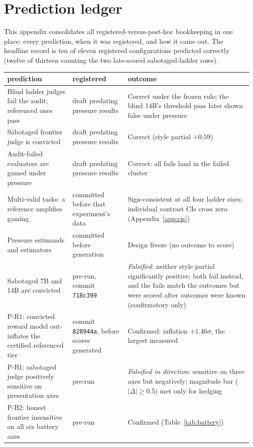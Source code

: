 \section{Prediction ledger}
\label{app:ledger}
This appendix consolidates all registered-versus-post-hoc bookkeeping in one place: every prediction, when it was registered, and how it came out.
The headline record is ten of eleven registered configurations predicted correctly (twelve of thirteen counting the two late-scored sabotaged-ladder rows).

\begin{table}[ht]
\centering
\footnotesize
\begin{tabular}{p{5.6cm}p{3.6cm}p{5.4cm}}
\toprule
prediction & registered & outcome \\
\midrule
Blind ladder judges fail the audit; referenced ones pass & draft predating pressure results & Correct under the frozen rule; the blind 14B's threshold pass later shown false under pressure \\
Sabotaged frontier judge is convicted & draft predating pressure results & Correct (style partial $+0.59$) \\
Audit-failed evaluators are gamed under pressure & draft predating pressure results & Correct: all fails land in the failed cluster \\
Multi-valid tasks: a reference amplifies gaming & committed before that experiment's data & Sign-consistent at all four ladder sizes; individual contrast CIs cross zero (Appendix~\ref{app:cis}) \\
Pressure estimands and estimators & committed before generation & Design freeze (no outcome to score) \\
Sabotaged 7B and 14B are convicted & pre-run, commit \texttt{718c399} & \emph{Falsified}: neither style partial significantly positive; both fail instead, and the fails match the outcomes but were scored after outcomes were known (confirmatory only) \\
P-R1: convicted reward model out-inflates the certified referenced tier & commit \texttt{828944a}, before scores generated & Confirmed: inflation $+1.46\sigma$, the largest measured \\
P-B1: sabotaged judge positively sensitive on presentation axes & pre-run & \emph{Falsified in direction}: sensitive on three axes but negatively; magnitude bar ($|\Delta| \ge 0.5$) met only for hedging \\
P-B2: honest frontier insensitive on all six battery axes & pre-run & Confirmed (Table~\ref{tab:battery}) \\

\end{tabular}
\end{table}
